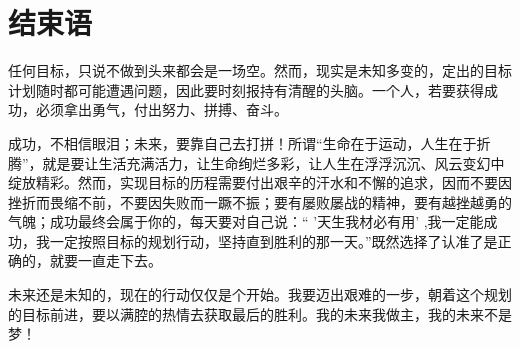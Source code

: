 \documentclass{article}
\begin{document}
\section{结束语}
任何目标，只说不做到头来都会是一场空。然而，现实是未知多变的，定出的目标计划随时都可能遭遇问题，因此要时刻报持有清醒的头脑。一个人，若要获得成功，必须拿出勇气，付出努力、拼搏、奋斗。\par
成功，不相信眼泪；未来，要靠自己去打拼！所谓“生命在于运动，人生在于折腾”，就是要让生活充满活力，让生命绚烂多彩，让人生在浮浮沉沉、风云变幻中绽放精彩。然而，实现目标的历程需要付出艰辛的汗水和不懈的追求，因而不要因挫折而畏缩不前，不要因失败而一蹶不振；要有屡败屡战的精神，要有越挫越勇的气魄；成功最终会属于你的，每天要对自己说：“ ’天生我材必有用’ ,我一定能成功，我一定按照目标的规划行动，坚持直到胜利的那一天。”既然选择了认准了是正确的，就要一直走下去。\par
未来还是未知的，现在的行动仅仅是个开始。我要迈出艰难的一步，朝着这个规划的目标前进，要以满腔的热情去获取最后的胜利。我的未来我做主，我的未来不是梦！\par
\end{document}
